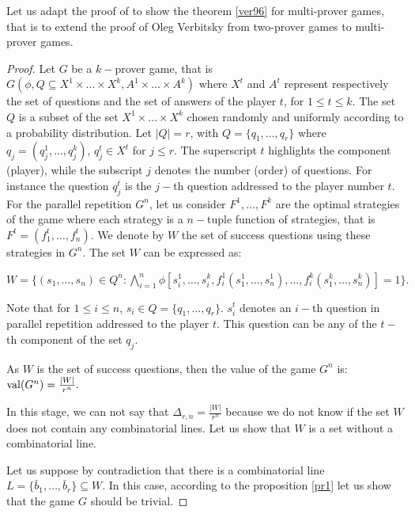 Let us adapt the proof of  \cite{verbitsky1996towards} to show the theorem \eqref{ver96} for multi-prover games, that is to extend the proof of Oleg Verbitsky from two-prover games to multi-prover games.

\begin{proof}
  Let $G$ be a $k-$prover game, that is $G(\phi, Q\subseteq X^1 \times \ldots \times X^k, A^1 \times \ldots \times A^k)$ where $X^t$ and $A^t$ represent respectively the set of questions and the set of answers of the player $t$, for $1\leq t \leq k.$ The set $Q$ is a subset of the set $X^1 \times \ldots \times X^k$ chosen randomly and uniformly according to a probability distribution.
  Let $|Q|=r$, with $Q=\{q_1, \ldots, q_r\}$ where $q_j=(q_j^1,\ldots, q_j^k)$, $q_j^t \in X^t$ for $j\leq r.$ The superscript  $t$ highlights the component (player), while the subscript $j$ denotes the number (order) of questions. For instance the question $q_j^t$ is the $j-$th question addressed to the player number $t.$  For the parallel repetition $G^n$, let us consider $F^1, \ldots, F^k$ are the optimal strategies of the game where each strategy is a $n-$tuple function of strategies, that is $F^t=(f_1^t,\ldots, f_n^t)$. We denote by $W$ the set of success questions using these strategies in $G^n.$ The set $W$ can be expressed as: 
 
$W=\{(s_1, \ldots, s_n) \in Q^n: \bigwedge\limits_{i=1}^n \phi \left[ s_i^1, \ldots, s_i^k, f_i^1(s_1^1, \ldots, s_n^1), \ldots, f_i^k(s_1^k, \ldots, s_n^k) \right]=1 \}.$

Note that for $1\leq i \leq n$,  $s_i \in Q=\{q_1, \ldots, q_r\}.$ $s_i^t$ denotes an $i-$th question in parallel repetition addressed to the player $t$. This question can be any of the $t-$th component of the set  $q_j.$
 
As $W$ is the set of success questions, then the value of the game $G^n$ is: $\mathrm{val} (G^n) = \frac{|W|}{r^n}.$
 
In this stage, we can not say that $\Delta_{r,n}=\frac{|W|}{r^n}$
because we do not know if the set  $W$ does not contain any combinatorial lines. Let us show that $W$ is a set without a combinatorial line.

Let us suppose by contradiction that there is a combinatorial line $L=\{\bar{b}_1, \ldots, \bar{b}_r \} \subseteq W.$ In this case, according to the proposition \eqref{pr1} let us show that the game  $G$ should be trivial.
 

\end{proof}
